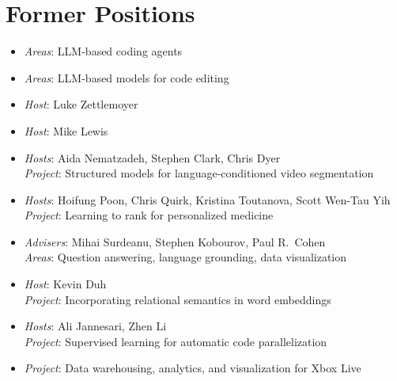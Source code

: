 \section{Former Positions}
\begin{itemize}[leftmargin=-0.4mm,partopsep=0pt,label=]

  \item {}
    \emph{Areas}: LLM-based coding agents

  \item {}
    \emph{Areas}: LLM-based models for code editing

  \item {}
    \emph{Host}: Luke Zettlemoyer

  \item {}
    \emph{Host}: Mike Lewis

  \item {}
    \emph{Hosts}: Aida Nematzadeh, Stephen Clark, Chris Dyer \\
    \emph{Project}: Structured models for language-conditioned video segmentation

  \item {}
    \emph{Hosts}: Hoifung Poon, Chris Quirk, Kristina Toutanova, Scott Wen-Tau Yih \\
    \emph{Project}: Learning to rank for personalized medicine

  \item {}
    \emph{Advisers}: Mihai Surdeanu, Stephen Kobourov, Paul R.\ Cohen \\
        \emph{Areas}: Question answering, language grounding, data visualization

  \item {}
    \emph{Host}: Kevin Duh \\
    \emph{Project}: Incorporating relational semantics in word embeddings

  \item {}
    \emph{Hosts}: Ali Jannesari, Zhen Li \\
    \emph{Project}: Supervised learning for automatic code parallelization

  \item {}
    \emph{Project}: Data warehousing, analytics, and visualization for Xbox Live
\end{itemize}

